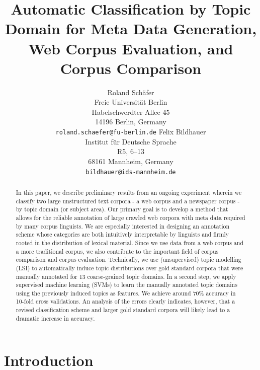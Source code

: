 \documentclass[11pt]{article}
\title{Automatic Classification by Topic Domain for Meta Data Generation, Web Corpus Evaluation, and Corpus Comparison}
\author{Roland Schäfer\\
	    Freie Universität Berlin\\
	    Habelschwerdter Allee 45\\
	    14196 Berlin, Germany\\
	    {\tt roland.schaefer@fu-berlin.de}
	  \And
	Felix Bildhauer\\
  	Institut für Deutsche Sprache\\
  	R5, 6--13\\
  	68161 Mannheim, Germany\\
  {\tt bildhauer@ids-mannheim.de}}
\date{}
\begin{document}
\maketitle

\begin{abstract}
In this paper, we describe preliminary results from an ongoing experiment wherein we classify two large unstructured text corpora - a web corpus and a
newspaper corpus - by topic domain (or subject area).
Our primary goal is to develop a method that allows for the reliable annotation of large crawled web corpora with meta data required by many corpus linguists. We are especially interested in designing an annotation scheme whose categories are both intuitively interpretable by linguists and firmly rooted in the distribution of lexical material.
Since we use data from a web corpus and a more traditional corpus, we also contribute to the important field of corpus comparison and corpus evaluation.
Technically, we use (unsupervised) topic modelling (LSI) to automatically induce topic distributions over gold standard corpora that were manually annotated for 13 coarse-grained topic domains.
In a second step, we apply supervised machine learning (SVMs) to learn the manually annotated topic domains using the previously induced topics as features.
We achieve around 70\% accuracy in 10-fold cross validations.
An analysis of the errors clearly indicates, however, that a revised classification scheme and larger gold standard corpora will likely lead to a dramatic increase in accuracy.
\end{abstract}

\section{Introduction}
\label{sec:introduction}
\end{document}
